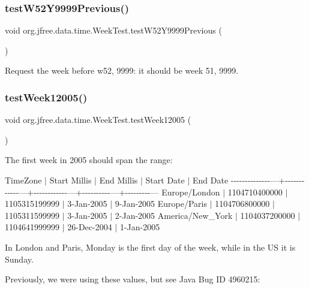 \subsubsection{\texorpdfstring{test\+W52\+Y9999\+Previous()}{testW52Y9999Previous()}}
{\footnotesize\ttfamily void org.\+jfree.\+data.\+time.\+Week\+Test.\+test\+W52\+Y9999\+Previous (\begin{DoxyParamCaption}{ }\end{DoxyParamCaption})}

Request the week before w52, 9999\+: it should be week 51, 9999. \mbox{\label{classorg_1_1jfree_1_1data_1_1time_1_1_week_test_af358a4218ddded9fa14e0f1adf3ef7e5}} 
\subsubsection{\texorpdfstring{test\+Week12005()}{testWeek12005()}}
{\footnotesize\ttfamily void org.\+jfree.\+data.\+time.\+Week\+Test.\+test\+Week12005 (\begin{DoxyParamCaption}{ }\end{DoxyParamCaption})}

The first week in 2005 should span the range\+:

Time\+Zone $\vert$ Start Millis $\vert$ End Millis $\vert$ Start Date $\vert$ End Date -\/-\/-\/-\/-\/-\/-\/-\/-\/-\/-\/-\/-\/-\/---+-\/-\/-\/-\/-\/-\/-\/-\/-\/-\/-\/-\/---+-\/-\/-\/-\/-\/-\/-\/-\/-\/-\/-\/-\/---+-\/-\/-\/-\/-\/-\/-\/-\/-\/-\/---+-\/-\/-\/-\/-\/-\/-\/-\/-\/--- Europe/\+London $\vert$ 1104710400000 $\vert$ 1105315199999 $\vert$ 3-\/\+Jan-\/2005 $\vert$ 9-\/\+Jan-\/2005 Europe/\+Paris $\vert$ 1104706800000 $\vert$ 1105311599999 $\vert$ 3-\/\+Jan-\/2005 $\vert$ 2-\/\+Jan-\/2005 America/\+New\+\_\+\+York $\vert$ 1104037200000 $\vert$ 1104641999999 $\vert$ 26-\/\+Dec-\/2004 $\vert$ 1-\/\+Jan-\/2005

In London and Paris, Monday is the first day of the week, while in the US it is Sunday.

Previously, we were using these values, but see Java Bug ID 4960215\+:

